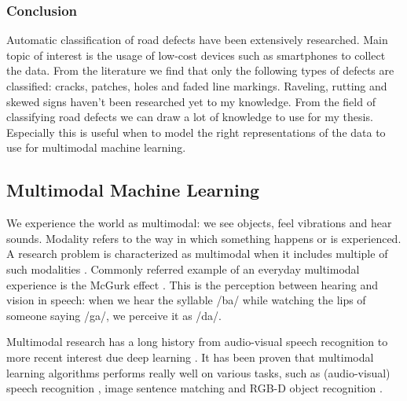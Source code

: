 \subsubsection{Conclusion}
Automatic classification of road defects have been extensively researched. Main topic of interest is the usage of low-cost devices such as smartphones to collect the data. From the literature we find that only the following types of defects are classified: cracks, patches, holes and faded line markings. Raveling, rutting and skewed signs haven't been researched yet to my knowledge. From the field of classifying road defects we can draw a lot of knowledge to use for my thesis. Especially this is useful when to model the right representations of the data to use for multimodal machine learning.




\subsection{Multimodal Machine Learning}
\label{section:multimodal-ml}

We experience the world as multimodal: we see objects, feel vibrations and hear sounds. Modality refers to the way in which something happens or is experienced. A research problem is characterized as multimodal when it includes multiple of such modalities \cite{Baltrusaitis2017}. Commonly referred example of an everyday multimodal experience is the McGurk effect \cite{McGurk1976}. This is the perception between hearing and vision in speech: when we hear the syllable /ba/ while watching the lips of someone saying /ga/, we perceive it as /da/. 

Multimodal research has a long history from audio-visual speech recognition to more recent interest due deep learning \cite{Ngiam2011}. It has been proven that multimodal learning algorithms performs really well on various tasks, such as (audio-visual) speech recognition \cite{Noda2014}, image sentence matching \cite{Ma2015} and RGB-D object recognition \cite{Eitel2015,Xu2017,Sindagi2019}.

